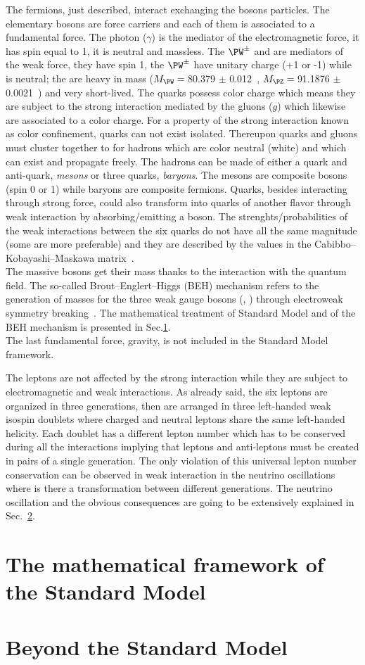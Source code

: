 The fermions, just described, interact exchanging the bosons particles. The elementary bosons are force carriers and each of them is associated to a fundamental force. The photon ($\gamma$) is the mediator of the electromagnetic force, it has spin equal to 1, it is neutral and massless. The $\PW^{\pm}$ and \PZ are mediators of the weak force, they have spin 1, the $\PW^{\pm}$ have unitary charge (+1 or -1) while \PZ is neutral; the are heavy in mass ($M_\PW =\:$80.379 $\pm$ 0.012\GeV~\cite{pdgw}, $M_\PZ =\:$91.1876 $\pm$ 0.0021\GeV~\cite{pdgz}) and very short-lived. The quarks possess color charge which means they are subject to the strong interaction mediated by the gluons ($g$) which likewise are associated to a color charge. For a property of the strong interaction known as color confinement, quarks can not exist isolated. Thereupon quarks and gluons must cluster together to for hadrons which are color neutral (white) and which can exist and propagate freely. The hadrons can be made of either a quark and anti-quark, \emph{mesons} or three quarks, \emph{baryons}. The mesons are composite bosons (spin 0 or 1) while baryons are composite fermions. Quarks, besides interacting through strong force, could also transform into quarks of another flavor through weak interaction by absorbing/emitting a \PW boson. The strenghts/probabilities of the weak interactions between the six quarks do not have all the same magnitude (some are more preferable) and they are described by the values in the Cabibbo–Kobayashi–Maskawa matrix~\cite{10.1143/PTP.28.870}.\\
The massive bosons get their mass thanks to the interaction with the quantum field. The so-called Brout–Englert–Higgs (BEH) mechanism refers to the generation of masses for the three weak gauge bosons (\PW, \PZ) through electroweak symmetry breaking~\cite{PhysRevLett.13.321,PhysRevLett.13.508}. The mathematical treatment of Standard Model and of the BEH mechanism is presented in Sec.\ref{sec:mathSM}.\\
The last fundamental force, gravity, is not included in the Standard Model framework. 

The leptons are not affected by the strong interaction while they are subject to electromagnetic and weak interactions. As already said, the six leptons are organized in three generations, then are arranged in three left-handed weak isospin doublets where charged and neutral leptons share the same left-handed helicity. Each doublet has a different lepton number which has to be conserved during all the interactions implying that leptons and anti-leptons must be created in pairs of a single generation. The only violation of this universal lepton number conservation can be observed in weak interaction in the neutrino oscillations where is there a transformation between different generations. The neutrino oscillation and the obvious consequences are going to be extensively explained in Sec.~\ref{sec:bsm}. 


\section{The mathematical framework of the Standard Model}\label{sec:mathSM}


\section{Beyond the Standard Model}\label{sec:bsm}
